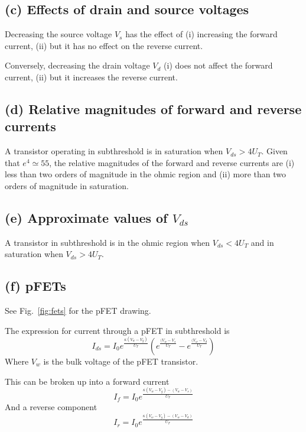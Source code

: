 \subsection{(c) Effects of drain and source voltages}
Decreasing the source voltage \(V_s\) has the effect of (i) increasing the forward current, (ii) but it has no effect on
the reverse current.

Conversely, decreasing the drain voltage \(V_d\) (i) does not affect the forward current, (ii) but it increases the reverse current.

\subsection{(d) Relative magnitudes of forward and reverse currents}
A transistor operating in subthreshold is in saturation when \(V_{ds}>4U_T\). Given that \(e^4 \simeq 55\), the relative magnitudes of 
the forward and reverse currents are (i) less than two orders of magnitude in the ohmic region and (ii) more than two orders of magnitude 
in saturation.

\subsection{(e) Approximate values of \(V_{ds}\)}
A transistor in subthreshold is in the ohmic region when \(V_{ds}<4U_T\) and in saturation when \(V_{ds}>4U_T\).

\subsection{(f) pFETs}
See Fig.~\ref{fig:fets} for the pFET drawing.

The expression for current through a pFET in subthreshold is
\begin{equation*}
    I_{ds} = I_0e^{\frac{\kappa (V_w-V_g)}{U_T}}\left(e^{\frac{(V_w-V_s}{U_T}}-e^{\frac{(V_w-V_d}{U_T}}\right)
\end{equation*}
Where \(V_w\) is the bulk voltage of the pFET transistor.

This can be broken up into a forward current
\begin{equation*}
    I_f = I_0e^{\frac{\kappa (V_w-V_g)-(V_w-V_s)}{U_T}}
\end{equation*}
And a reverse component
\begin{equation*}
    I_r = I_0e^{\frac{\kappa (V_w-V_g)-(V_w-V_d)}{U_T}}
\end{equation*}

